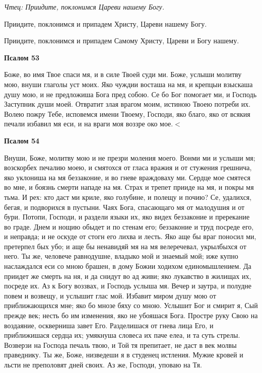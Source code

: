 


 

 


\itshape Чтец\normalfont{}: Приидите, поклонимся Цареви нашему Богу.



Приидите, поклонимся и припадем Христу, Цареви нашему Богу.



Приидите, поклонимся и припадем Самому Христу, Цареви и Богу нашему.


\medskip
\bfseries Псалом 53\normalfont{}\nopagebreak

Боже, во имя Твое спаси мя, и в силе Твоей суди ми. Боже, услыши молитву мою, внуши глаголы уст моих. Яко чуждии восташа на мя, и крепцыи взыскаша душу мою, и не предложиша Бога пред собою. Се бо Бог помогает ми, и Господь Заступник души моей. Отвратит злая врагом моим, истиною Твоею потреби их. Волею пожру Тебе, исповемся имени Твоему, Господи, яко благо, яко от всякия печали избавил мя еси, и на враги моя воззре око мое.$<$


\medskip
\bfseries Псалом 54\normalfont{}\nopagebreak


Внуши, Боже, молитву мою и не презри моления моего. Вонми ми и услыши мя; возскорбех печалию моею, и смятохся от гласа вражия и от стужения грешнича, яко уклониша на мя беззаконие, и во гневе враждоваху ми. Сердце мое смятеся во мне, и боязнь смерти нападе на мя. Страх и трепет прииде на мя, и покры мя тьма. И рех: кто даст ми криле, яко голубине, и полещу и почию? Се, удалихся, бегая, и подворихся в пустыни. Чаях Бога, спасающаго мя от малодушия и от бури. Потопи, Господи, и раздели языки их, яко видех беззаконие и пререкание во граде. Днем и нощию обыдет и по стенам его; беззаконие и труд посреде его, и неправда; и не оскуде от стогн его лихва и лесть. Яко аще бы враг поносил ми, претерпел бых убо; и аще бы ненавидяй мя на мя велеречевал, укрылбыхся от него. Ты же, человече равнодушне, владыко мой и знаемый мой; иже купно наслаждался еси со мною брашен, в дому Божии ходихом единомышлением. Да приидет же смерть на ня, и да снидут во ад живи; яко лукавство в жилищах их, посреде их. Аз к Богу воззвах, и Господь услыша мя. Вечер и заутра, и полудне повем и возвещу, и услышит глас мой. Избавит миром душу мою от приближающихся мне; яко бо мнозе бяху со мною. Услышит Бог и смирит я, Сый прежде век; несть бо им изменения, яко не убояшася Бога. Простре руку Свою на воздаяние, оскверниша завет Его. Разделишася от гнева лица Его, и приближишася сердца их; умякнуша словеса их паче елеа, и та суть стрелы. Возверзи на Господа печаль твою, и Той тя препитает, не даст в век молвы праведнику. Ты же, Боже, низведеши я в студенец истления. Мужие кровей и льсти не преполовят дней своих. Аз же, Господи, уповаю на Тя.


